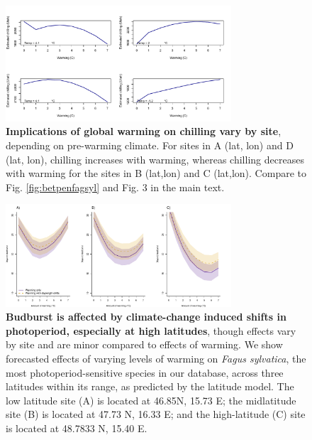 \documentclass{article}
\begin{document}
\begin{figure}[h!]
\centering
\noindent \includegraphics[width=0.75\textwidth]{..//..//analyses/bb_analysis/figures/forecasting/chillforecast_bothspp_PEP_utah.pdf}
\caption{\textbf{Implications of global warming on chilling vary by site}, depending on pre-warming climate. For sites in A (lat, lon) and D (lat, lon), chilling increases with warming, whereas chilling decreases with warming for the sites in B (lat,lon) and C (lat,lon). Compare to Fig. \ref{fig:betpenfagsyl} and Fig. 3 in the main text.}
\label{fig:chillfore}
\end{figure}

\begin{figure}[h!]
\centering
\noindent \includegraphics[width=0.75\textwidth]{..//..//analyses/bb_analysis/figures/forecasting/fagsyl_3lats.pdf}
\caption{\textbf{Budburst is affected by climate-change induced shifts in photoperiod, especially at high latitudes}, though effects vary by site and are minor compared to effects of warming. We show forecasted effects of varying levels of warming on \emph{Fagus sylvatica}, the most photoperiod-sensitive species in our database, across three latitudes within its range, as predicted by the latitude model. The low latitude site (A) is  located at 46.85\degree N, 15.73 \degree E; the midlatitude site (B) is located at 47.73 \degree N, 16.33 \degree E; and the high-latitude (C) site is located at 48.7833 \degree N, 15.40 \degree E.}
\label{fig:fagsyllat}
\end{figure}
\end{document}
